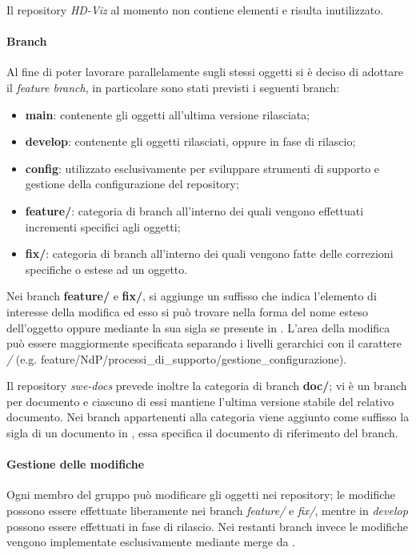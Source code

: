Il repository \emph{HD-Viz} al momento non contiene elementi e risulta inutilizzato.
%

\paragraph{Branch}
\label{par:gestione_configurazione:branching}

Al fine di poter lavorare parallelamente sugli stessi oggetti si è deciso di adottare il  \emph{feature branch}, in 
particolare sono stati previsti i seguenti branch: 
\begin{itemize}
	\item \textbf{main}: contenente gli oggetti all'ultima versione rilasciata;
	\item \textbf{develop}: contenente gli oggetti rilasciati, oppure in fase di rilascio;
	\item \textbf{config}: utilizzato esclusivamente per sviluppare strumenti di supporto e gestione della configurazione del repository;
	\item \textbf{feature/}: categoria di branch all'interno dei quali vengono effettuati incrementi specifici agli oggetti; 
	\item \textbf{fix/}: categoria di branch all'interno dei quali vengono fatte delle correzioni specifiche o estese ad un oggetto.
\end{itemize}
Nei branch \textbf{feature/} e \textbf{fix/}, si aggiunge un suffisso che indica l'elemento di interesse della modifica ed esso si può trovare
nella forma del nome esteso dell'oggetto oppure mediante la sua sigla se presente in . L'area della modifica può essere 
maggiormente specificata separando i livelli gerarchici con il carattere \emph{/} (e.g. feature/NdP/processi\_di\_supporto/gestione\_configurazione).

Il repository \emph{swe-docs} prevede inoltre la categoria di branch \textbf{doc/}; vi è un branch per documento e ciascuno di 
essi mantiene l'ultima versione stabile del relativo documento. Nei branch appartenenti alla categoria viene aggiunto come suffisso la 
sigla di un documento in , essa specifica il documento di riferimento del branch.

\paragraph{Gestione delle modifiche}
\label{par:gestione_modifiche}
Ogni membro del gruppo può modificare gli oggetti nei repository; le modifiche possono essere effettuate liberamente nei branch 
\emph{feature/} e \emph{fix/}, mentre in \emph{develop} possono essere effettuati  in fase di rilascio. Nei restanti 
branch invece le modifiche vengono implementate esclusivamente mediante merge da .

